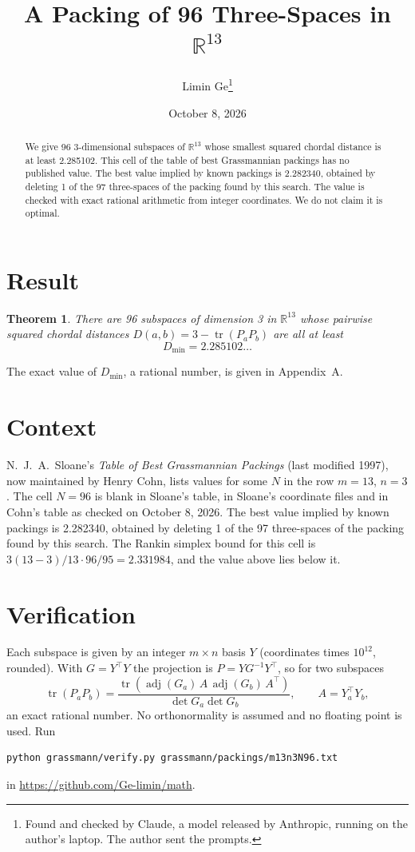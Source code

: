\documentclass[11pt,a4paper]{article}
\title{A Packing of 96 Three-Spaces in $\mathbb{R}^{13}$}
\author{Limin Ge\thanks{Found and checked by Claude, a model released by Anthropic, running on the author's laptop. The author sent the prompts.}}
\date{October 8, 2026}
\newtheorem*{theorem}{Theorem}
\begin{document}
\maketitle
\begin{abstract}
We give 96 3-dimensional subspaces of $\mathbb{R}^{13}$ whose smallest squared chordal distance is at least 2.285102. This cell of the table of best Grassmannian packings has no published value. The best value implied by known packings is 2.282340, obtained by deleting 1 of the 97 three-spaces of the packing found by this search. The value is checked with exact rational arithmetic from integer coordinates. We do not claim it is optimal.
\end{abstract}

\section{Result}
\begin{theorem}
There are 96 subspaces of dimension 3 in $\mathbb{R}^{13}$ whose pairwise squared chordal distances $D(a,b) = 3 - \operatorname{tr}(P_aP_b)$ are all at least
\[ D_{\min} = 2.285102\ldots \]
\end{theorem}
The exact value of $D_{\min}$, a rational number, is given in Appendix~A.


\section{Context}
N.~J.~A.~Sloane's \emph{Table of Best Grassmannian Packings} (last modified 1997), now maintained by Henry Cohn, lists values for some $N$ in the row $m=13$, $n=3$. The cell $N=96$ is blank in Sloane's table, in Sloane's coordinate files and in Cohn's table as checked on October 8, 2026. The best value implied by known packings is 2.282340, obtained by deleting 1 of the 97 three-spaces of the packing found by this search. The Rankin simplex bound for this cell is $3(13-3)/13\cdot 96/95 = 2.331984$, and the value above lies below it.


\section{Verification}
Each subspace is given by an integer $m\times n$ basis $Y$ (coordinates times $10^{12}$, rounded). With $G=Y^\top Y$ the projection is $P=YG^{-1}Y^\top$, so for two subspaces
\[ \operatorname{tr}(P_aP_b)=\frac{\operatorname{tr}(\operatorname{adj}(G_a)\,A\,\operatorname{adj}(G_b)\,A^\top)}{\det G_a\det G_b},\qquad A=Y_a^\top Y_b, \]
an exact rational number. No orthonormality is assumed and no floating point is used. Run
\begin{verbatim}
python grassmann/verify.py grassmann/packings/m13n3N96.txt
\end{verbatim}
in \url{https://github.com/Ge-limin/math}.
\end{document}
